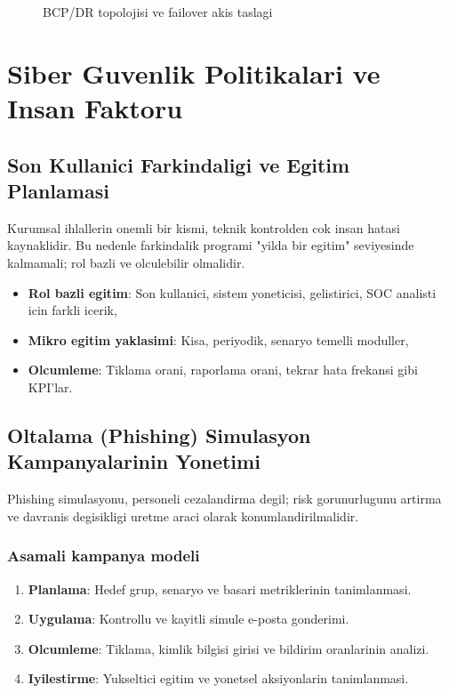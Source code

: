 \begin{figure}[htbp]
    \centering
    \caption{BCP/DR topolojisi ve failover akis taslagi}
    \label{fig:ch1-bcp-dr-topology}
\end{figure}

\section{Siber Guvenlik Politikalari ve Insan Faktoru}

\subsection{Son Kullanici Farkindaligi ve Egitim Planlamasi}
Kurumsal ihlallerin onemli bir kismi, teknik kontrolden cok insan hatasi kaynaklidir.
Bu nedenle farkindalik programi "yilda bir egitim" seviyesinde kalmamali; rol bazli ve olculebilir olmalidir.

\begin{itemize}
    \item \textbf{Rol bazli egitim}: Son kullanici, sistem yoneticisi, gelistirici, SOC analisti icin farkli icerik,
    \item \textbf{Mikro egitim yaklasimi}: Kisa, periyodik, senaryo temelli moduller,
    \item \textbf{Olcumleme}: Tiklama orani, raporlama orani, tekrar hata frekansi gibi KPI'lar.
\end{itemize}

\subsection{Oltalama (Phishing) Simulasyon Kampanyalarinin Yonetimi}
Phishing simulasyonu, personeli cezalandirma degil; risk gorunurlugunu artirma ve davranis degisikligi
uretme araci olarak konumlandirilmalidir.

\subsubsection{Asamali kampanya modeli}
\begin{enumerate}
    \item \textbf{Planlama}: Hedef grup, senaryo ve basari metriklerinin tanimlanmasi.
    \item \textbf{Uygulama}: Kontrollu ve kayitli simule e-posta gonderimi.
    \item \textbf{Olcumleme}: Tiklama, kimlik bilgisi girisi ve bildirim oranlarinin analizi.
    \item \textbf{Iyilestirme}: Yukseltici egitim ve yonetsel aksiyonlarin tanimlanmasi.
\end{enumerate}

